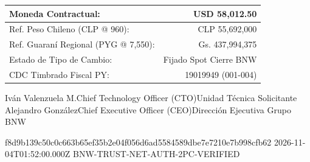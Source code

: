 \documentclass[10pt,letterpaper]{article}
\begin{document}
\begin{minipage}[t]{0.45\textwidth}
  \begin{tcolorbox}[
    enhanced,
    colback=white,
    colframe=corpBorder,
    arc=2mm,
    boxrule=0.8pt,
    title={\small\bfseries\color{corpDarkHeader}EQUIVALENCIAS MULTIMONEDA},
    colbacktitle=corpLightBg,
    top=2.5mm, bottom=2.5mm, left=3.5mm, right=3.5mm
  ]
    {\scriptsize\renewcommand{\arraystretch}{1.2}
    \begin{tabularx}{\linewidth}{@{}Xr@{}}
      \textbf{Moneda Contractual:} & \textbf{USD 58,012.50} \\
      \midrule
      Ref. Peso Chileno (CLP @ 960): & CLP 55,692,000 \\
      Ref. Guaran\'i Regional (PYG @ 7,550): & Gs. 437,994,375 \\
      Estado de Tipo de Cambio: & Fijado Spot Cierre BNW \\
      CDC Timbrado Fiscal PY: & 19019949 (001-004) \\
    \end{tabularx}}
  \end{tcolorbox}
\end{minipage}

\vspace{0.3cm}

\dualcontrolsignature%
  {Iv\'an Valenzuela M.}{Chief Technology Officer (CTO)}{Unidad T\'ecnica Solicitante}%
  {Alejandro Gonz\'alez}{Chief Executive Officer (CEO)}{Direcci\'on Ejecutiva Grupo BNW}

\vspace{0.25cm}

\cryptoseal%
  {f8d9b139c50c0c663b65ef35b2e04f056d6ad5584589dbe7e7210e7b998cfb62}%
  {2026-11-04T01:52:00.000Z}%
  {BNW-TRUST-NET-AUTH-2PC-VERIFIED}
\end{document}
